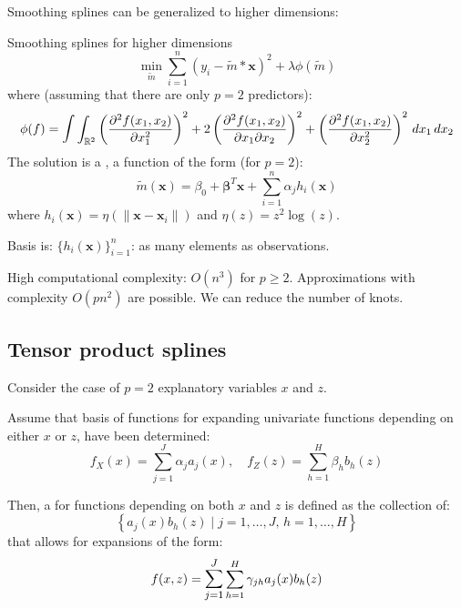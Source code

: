 Smoothing splines can be generalized to higher dimensions:
\begin{problem}{Smoothing splines for higher dimensions}{}
    \begin{equation*}
        \min_{\tilde m} \sum_{i=1}^n  \left( y_i - \tilde m*\boldsymbol x \right)^2 + \lambda \phi (\tilde m)
    \end{equation*}
    where (assuming that there are only $p=2$ predictors):
    \begin{equation*}
        \phi(f) = \mathlarger{\int} \int_{\mathbb R^2}
            \left( \frac{\partial^2 f(x_1, x_2)}{\partial x_1^2} \right)^2
            + 2 \left( \frac{\partial^2 f(x_1, x_2)}{\partial x_1 \partial x_2} \right)^2
            + \left( \frac{\partial^2 f(x_1, x_2)}{\partial x_2^2} \right)^2
            \, dx_1 \, dx_2
    \end{equation*}
    \tcblower
    The solution is a , a function of the form (for $p=2$):
    \begin{equation*}
        \tilde m (\boldsymbol x) = \beta_0 + \boldsymbol\beta^T \boldsymbol x
        + \sum_{i=1}^n \alpha_jh_i(\boldsymbol x)
    \end{equation*}
    where $h_i(\boldsymbol x) = \eta \left( \lVert \boldsymbol x - \boldsymbol x_i \rVert \right)$
    and $\eta(z) = z^2 \log(z)$.

    Basis is: $\{h_i(\boldsymbol x)\}_{i=1}^n$: as many elements as observations.

    \begin{note}
        High computational complexity: $O(n^3)$ for $p \geq 2$. Approximations
        with complexity $O(pn^2)$ are possible. We can reduce the number of
        knots.
    \end{note}
\end{problem}

\subsection{Tensor product splines}
Consider the case of $p=2$ explanatory variables $x$ and $z$.

Assume that basis of functions for expanding univariate functions depending on either
$x$ or $z$, have been determined:
\begin{equation*}
    f_X(x) = \sum_{j=1}^J \alpha_ja_j(x),\quad f_Z(z) = \sum_{h=1}^H \beta_hb_h(z)
\end{equation*}

Then, a  for functions depending on both $x$ and $z$ is
defined as the collection of:
\begin{equation*}
    \left\{
        a_j(x) b_h(z) \mid j=1,\ldots,J,\, h=1,\ldots,H
    \right\}
\end{equation*}
that allows for expansions of the form:
\begin{equation*}
    f(x,z) = \mathlarger{\sum_{j=1}^J} \sum_{h=1}^H \gamma_{jh} a_j(x) b_h(z)
\end{equation*}

